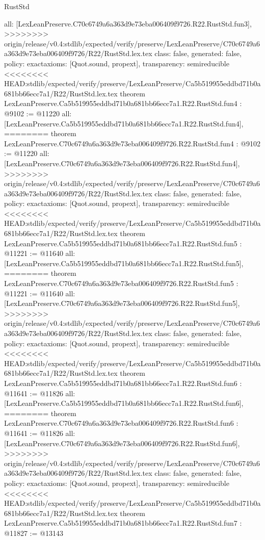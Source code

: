 \begin{lexlean}{RustStd}
\begin{coremodule}
{\begin{coremodule}
{{{{{{{  all: [LexLeanPreserve.C70c6749a6a363d9e73eba006409f9726.R22.RustStd.fun3],
>>>>>>>> origin/release/v0.4:stdlib/expected/verify/preserve/LexLeanPreserve/C70c6749a6a363d9e73eba006409f9726/R22/RustStd.lex.tex
  class: false,
  generated: false,
  policy: exact{axioms: [Quot.sound, propext]},
  transparency: semireducible
}
<<<<<<<< HEAD:stdlib/expected/verify/preserve/LexLeanPreserve/Ca5b519955eddbd71b0a681bb66ecc7a1/R22/RustStd.lex.tex
theorem LexLeanPreserve.Ca5b519955eddbd71b0a681bb66ecc7a1.R22.RustStd.fun4 : @9102 := @11220 {
  all: [LexLeanPreserve.Ca5b519955eddbd71b0a681bb66ecc7a1.R22.RustStd.fun4],
========
theorem LexLeanPreserve.C70c6749a6a363d9e73eba006409f9726.R22.RustStd.fun4 : @9102 := @11220 {
  all: [LexLeanPreserve.C70c6749a6a363d9e73eba006409f9726.R22.RustStd.fun4],
>>>>>>>> origin/release/v0.4:stdlib/expected/verify/preserve/LexLeanPreserve/C70c6749a6a363d9e73eba006409f9726/R22/RustStd.lex.tex
  class: false,
  generated: false,
  policy: exact{axioms: [Quot.sound, propext]},
  transparency: semireducible
}
<<<<<<<< HEAD:stdlib/expected/verify/preserve/LexLeanPreserve/Ca5b519955eddbd71b0a681bb66ecc7a1/R22/RustStd.lex.tex
theorem LexLeanPreserve.Ca5b519955eddbd71b0a681bb66ecc7a1.R22.RustStd.fun5 : @11221 := @11640 {
  all: [LexLeanPreserve.Ca5b519955eddbd71b0a681bb66ecc7a1.R22.RustStd.fun5],
========
theorem LexLeanPreserve.C70c6749a6a363d9e73eba006409f9726.R22.RustStd.fun5 : @11221 := @11640 {
  all: [LexLeanPreserve.C70c6749a6a363d9e73eba006409f9726.R22.RustStd.fun5],
>>>>>>>> origin/release/v0.4:stdlib/expected/verify/preserve/LexLeanPreserve/C70c6749a6a363d9e73eba006409f9726/R22/RustStd.lex.tex
  class: false,
  generated: false,
  policy: exact{axioms: [Quot.sound, propext]},
  transparency: semireducible
}
<<<<<<<< HEAD:stdlib/expected/verify/preserve/LexLeanPreserve/Ca5b519955eddbd71b0a681bb66ecc7a1/R22/RustStd.lex.tex
theorem LexLeanPreserve.Ca5b519955eddbd71b0a681bb66ecc7a1.R22.RustStd.fun6 : @11641 := @11826 {
  all: [LexLeanPreserve.Ca5b519955eddbd71b0a681bb66ecc7a1.R22.RustStd.fun6],
========
theorem LexLeanPreserve.C70c6749a6a363d9e73eba006409f9726.R22.RustStd.fun6 : @11641 := @11826 {
  all: [LexLeanPreserve.C70c6749a6a363d9e73eba006409f9726.R22.RustStd.fun6],
>>>>>>>> origin/release/v0.4:stdlib/expected/verify/preserve/LexLeanPreserve/C70c6749a6a363d9e73eba006409f9726/R22/RustStd.lex.tex
  class: false,
  generated: false,
  policy: exact{axioms: [Quot.sound, propext]},
  transparency: semireducible
}
<<<<<<<< HEAD:stdlib/expected/verify/preserve/LexLeanPreserve/Ca5b519955eddbd71b0a681bb66ecc7a1/R22/RustStd.lex.tex
theorem LexLeanPreserve.Ca5b519955eddbd71b0a681bb66ecc7a1.R22.RustStd.fun7 : @11827 := @13143 {
}}}}}}}}}}
\end{coremodule}}
\end{coremodule}
\end{lexlean}
